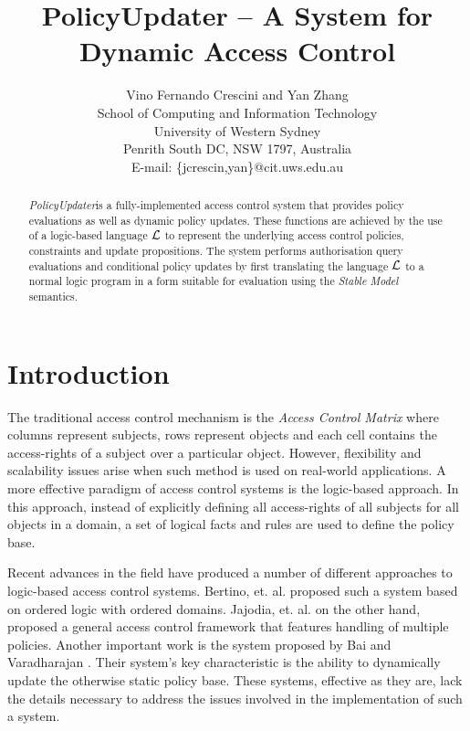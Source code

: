 \documentclass[11pt, twocolumn]{article}
\begin{document}
  \title{PolicyUpdater -- A System for Dynamic Access Control}
  \author{
    Vino Fernando Crescini and Yan Zhang                   \\
    School of Computing and Information Technology         \\
    University of Western Sydney                           \\
    Penrith South DC, NSW 1797, Australia                  \\
    E-mail: \{jcrescin,yan\}@cit.uws.edu.au
  }

  \date{}

  \maketitle

  \begin{abstract}
    {\em PolicyUpdater}\footnotemark is a fully-implemented access control
    system that provides policy evaluations as well as dynamic policy updates.
    These functions are achieved by the use of a logic-based language
    ${\cal L}$ to represent the underlying access control policies, constraints
    and update propositions. The system performs authorisation query
    evaluations and conditional policy updates by first translating the
    language $\cal{L}$ to a normal logic program in a form suitable for
    evaluation using the {\em Stable Model} semantics.
  \end{abstract}


  \section{Introduction}

    The traditional access control mechanism is the {\em Access Control Matrix}
    where columns represent subjects, rows represent objects and each cell
    contains the access-rights of a subject over a particular object. However,
    flexibility and scalability issues arise when such method is used on
    real-world applications. A more effective paradigm of access control
    systems is the logic-based approach. In this approach, instead of
    explicitly defining all access-rights of all subjects for all objects
    in a domain, a set of logical facts and rules are used to define the
    policy base.

    Recent advances in the field have produced a number of different approaches
    to logic-based access control systems. Bertino, et. al. \cite{BE1} proposed
    such a system based on ordered logic with ordered domains. Jajodia, et. al.
    \cite{JAJ} on the other hand, proposed a general access control framework
    that features handling of multiple policies. Another important work is
    the system proposed by Bai and Varadharajan \cite{BA1,BA2}. Their system's
    key characteristic is the ability to dynamically update the otherwise
    static policy base. These systems, effective as they are, lack the details
    necessary to address the issues involved in the implementation of such a
    system.
\end{document}
